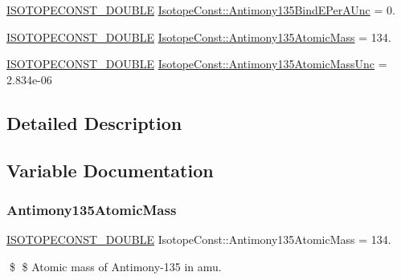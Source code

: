 \begin{DoxyCompactItemize}
\mbox{\hyperlink{group___isotope_const-_macros_ga8f45a7272ce02c0b4c65c44636ed719a}{I\+S\+O\+T\+O\+P\+E\+C\+O\+N\+S\+T\+\_\+\+D\+O\+U\+B\+LE}} \mbox{\hyperlink{group___isotope_const-_antimony-_sb135_ga2e877478b8940d4083d35a8fa32972e3}{Isotope\+Const\+::\+Antimony135\+Bind\+E\+Per\+A\+Unc}} = 0.
\item 
\mbox{\hyperlink{group___isotope_const-_macros_ga8f45a7272ce02c0b4c65c44636ed719a}{I\+S\+O\+T\+O\+P\+E\+C\+O\+N\+S\+T\+\_\+\+D\+O\+U\+B\+LE}} \mbox{\hyperlink{group___isotope_const-_antimony-_sb135_ga34a40b7a13e479ba921bfba05f590083}{Isotope\+Const\+::\+Antimony135\+Atomic\+Mass}} = 134.
\item 
\mbox{\hyperlink{group___isotope_const-_macros_ga8f45a7272ce02c0b4c65c44636ed719a}{I\+S\+O\+T\+O\+P\+E\+C\+O\+N\+S\+T\+\_\+\+D\+O\+U\+B\+LE}} \mbox{\hyperlink{group___isotope_const-_antimony-_sb135_gae3887a5a308c224ad25e94e3610e0e86}{Isotope\+Const\+::\+Antimony135\+Atomic\+Mass\+Unc}} = 2.\+834e-\/06
\end{DoxyCompactItemize}


\subsection{Detailed Description}


\subsection{Variable Documentation}
\mbox{\label{group___isotope_const-_antimony-_sb135_ga34a40b7a13e479ba921bfba05f590083}} 
\subsubsection{\texorpdfstring{Antimony135\+Atomic\+Mass}{Antimony135AtomicMass}}
{\footnotesize\ttfamily \mbox{\hyperlink{group___isotope_const-_macros_ga8f45a7272ce02c0b4c65c44636ed719a}{I\+S\+O\+T\+O\+P\+E\+C\+O\+N\+S\+T\+\_\+\+D\+O\+U\+B\+LE}} Isotope\+Const\+::\+Antimony135\+Atomic\+Mass = 134.}

\$ \$ Atomic mass of Antimony-\/135 in amu. \mbox{\label{group___isotope_const-_antimony-_sb135_gae3887a5a308c224ad25e94e3610e0e86}} 
